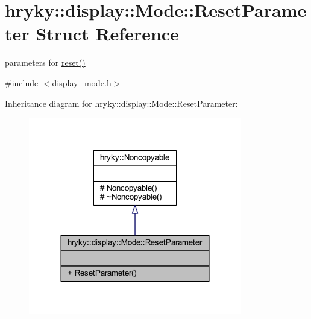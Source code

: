 \hypertarget{structhryky_1_1display_1_1_mode_1_1_reset_parameter}{\section{hryky\-:\-:display\-:\-:Mode\-:\-:Reset\-Parameter Struct Reference}
\label{structhryky_1_1display_1_1_mode_1_1_reset_parameter}
}


parameters for \hyperlink{classhryky_1_1display_1_1_mode_a6826c1efd764c64520bf954f480444d4}{reset()}  




{\ttfamily \#include $<$display\-\_\-mode.\-h$>$}



Inheritance diagram for hryky\-:\-:display\-:\-:Mode\-:\-:Reset\-Parameter\-:\nopagebreak
\begin{figure}[H]
\begin{center}
\leavevmode
\includegraphics[width=264pt]{structhryky_1_1display_1_1_mode_1_1_reset_parameter__inherit__graph}
\end{center}
\end{figure}
